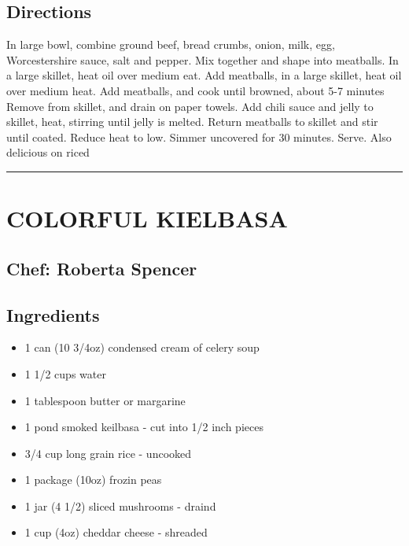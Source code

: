 \documentclass[
]{book}
\providecommand{\tightlist}{%
  \setlength{\itemsep}{0pt}\setlength{\parskip}{0pt}}
\begin{document}
\hypertarget{directions-50}{%
\subsection*{Directions}\label{directions-50}}


In large bowl, combine ground beef, bread crumbs, onion, milk, egg, Worcestershire sauce, salt and pepper.
Mix together and shape into meatballs. In a large skillet, heat oil over medium eat. Add meatballs,
in a large skillet, heat oil over medium heat. Add meatballs, and cook until browned, about 5-7 minutes\\
Remove from skillet, and drain on paper towels. Add chili sauce and jelly to skillet, heat, stirring until
jelly is melted. Return meatballs to skillet and stir until coated. Reduce heat to low. Simmer uncovered for
30 minutes. Serve. Also delicious on riced

\begin{center}\rule{0.5\linewidth}{0.5pt}\end{center}

\hypertarget{colorful-kielbasa}{%
\section*{COLORFUL KIELBASA}\label{colorful-kielbasa}}


\hypertarget{chef-roberta-spencer-18}{%
\subsection*{Chef: Roberta Spencer}\label{chef-roberta-spencer-18}}


\hypertarget{ingredients-51}{%
\subsection*{Ingredients}\label{ingredients-51}}


\begin{itemize}
\tightlist
\item
  1 can (10 3/4oz) condensed cream of celery soup
\item
  1 1/2 cups water
\item
  1 tablespoon butter or margarine
\item
  1 pond smoked keilbasa - cut into 1/2 inch pieces
\item
  3/4 cup long grain rice - uncooked
\item
  1 package (10oz) frozin peas
\item
  1 jar (4 1/2) sliced mushrooms - draind
\item
  1 cup (4oz) cheddar cheese - shreaded
\end{itemize}
\end{document}
